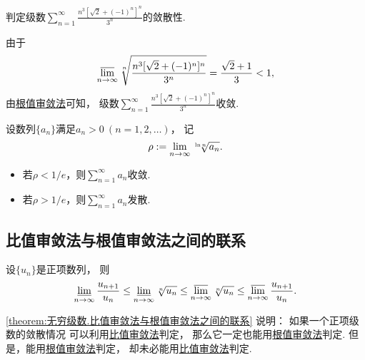 \begin{example}
判定级数\(\sum_{n=1}^\infty \frac{n^3[\sqrt2 + (-1)^n]^n}{3^n}\)的敛散性.
\begin{solution}
由于\[
	\varlimsup_{n\to\infty} \sqrt[n]{
		\frac{n^3[\sqrt2 + (-1)^n]^n}{3^n}
	}
	= \frac{\sqrt2+1}3
	< 1,
\]
由\hyperref[theorem:无穷级数.正项级数的根值审敛法]{根值审敛法}可知，
级数\(\sum_{n=1}^\infty \frac{n^3[\sqrt2 + (-1)^n]^n}{3^n}\)收敛.
\end{solution}
\end{example}

\begin{proposition}
设数列\(\{a_n\}\)满足\(a_n > 0\ (n=1,2,\dotsc)\)，
记\[
	\rho := \lim_{n\to\infty} \sqrt[\ln n]{a_n}.
\]
\begin{itemize}
	\item 若\(\rho < 1/e\)，则\(\sum_{n=1}^\infty a_n\)收敛.
	\item 若\(\rho > 1/e\)，则\(\sum_{n=1}^\infty a_n\)发散.
\end{itemize}
\end{proposition}

\subsection{比值审敛法与根值审敛法之间的联系}
\begin{theorem}\label{theorem:无穷级数.比值审敛法与根值审敛法之间的联系}
设\(\{u_n\}\)是正项数列，
则\[
	\varliminf_{n\to\infty} \frac{u_{n+1}}{u_n}
	\leq
	\varliminf_{n\to\infty} \sqrt[n]{u_n}
	\leq
	\varlimsup_{n\to\infty} \sqrt[n]{u_n}
	\leq
	\varlimsup_{n\to\infty} \frac{u_{n+1}}{u_n}.
\]
\end{theorem}
\begin{remark}
\cref{theorem:无穷级数.比值审敛法与根值审敛法之间的联系} 说明：
如果一个正项级数的敛散情况
可以利用\hyperref[theorem:无穷级数.正项级数的比值审敛法]{比值审敛法}判定，
那么它一定也能用\hyperref[theorem:无穷级数.正项级数的根值审敛法]{根值审敛法}判定.
但是，能用\hyperref[theorem:无穷级数.正项级数的根值审敛法]{根值审敛法}判定，
却未必能用\hyperref[theorem:无穷级数.正项级数的比值审敛法]{比值审敛法}判定.
\end{remark}

